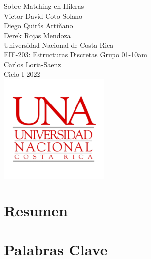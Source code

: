\documentclass[stu, 11pt, letterpaper, donotrepeattitle, floatsintext, natbib, helv]{apa7}
\begin{document}
\begin{titlepage}
    \centering
    \vfill
    \LARGE Sobre Matching en Hileras\\
    \vskip2cm
    \large Victor David Coto Solano \\
    \large Diego Quirós Artiñano \\
    \large Derek Rojas Mendoza \\
    \vskip2cm
    Universidad Nacional de Costa Rica \\
    EIF-203: Estructuras Discretas Grupo 01-10am \\ 
    Carlos Loria-Saenz \\
    Ciclo I 2022 \\
    \vfill
    \includegraphics[width = 0.4\textwidth]{./UNAImage/UNA.png} \\
    \vfill
    \vfill
\end{titlepage}


\section*{Resumen}

\section*{Palabras Clave}

\newpage
    \addto{}
\tableofcontents
\setcounter{tocdepth}{2}
\newpage
\renewcommand{\listfigurename}{\largeÍndice de fíguras}
\listoffigures
\newpage
\renewcommand{\listtablename}{\largeÍndice de tablas}
\listoftables
\newpage
\end{document}
